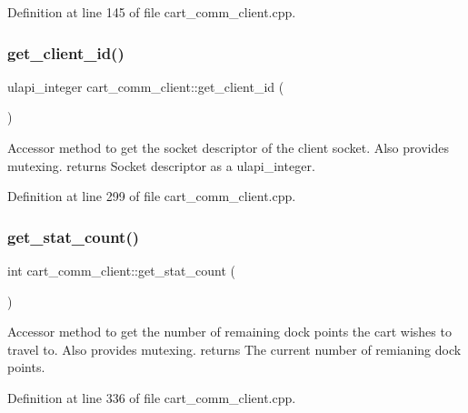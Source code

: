 Definition at line 145 of file cart\+\_\+comm\+\_\+client.\+cpp.

\mbox{\label{classcart__comm__client_ae7aa5e3ce2b4192163d24fee40191411}} 
\subsubsection{\texorpdfstring{get\+\_\+client\+\_\+id()}{get\_client\_id()}}
{\footnotesize\ttfamily ulapi\+\_\+integer cart\+\_\+comm\+\_\+client\+::get\+\_\+client\+\_\+id (\begin{DoxyParamCaption}{ }\end{DoxyParamCaption})}

Accessor method to get the socket descriptor of the client socket. Also provides mutexing. returns Socket descriptor as a ulapi\+\_\+integer. 

Definition at line 299 of file cart\+\_\+comm\+\_\+client.\+cpp.

\mbox{\label{classcart__comm__client_af857bf6da9431c0ebfa1862bf54ba912}} 
\subsubsection{\texorpdfstring{get\+\_\+stat\+\_\+count()}{get\_stat\_count()}}
{\footnotesize\ttfamily int cart\+\_\+comm\+\_\+client\+::get\+\_\+stat\+\_\+count (\begin{DoxyParamCaption}{ }\end{DoxyParamCaption})}

Accessor method to get the number of remaining dock points the cart wishes to travel to. Also provides mutexing. returns The current number of remianing dock points. 

Definition at line 336 of file cart\+\_\+comm\+\_\+client.\+cpp.

\mbox{\label{classcart__comm__client_a810796a4f52621b6d84307d42274dfd6}} 
